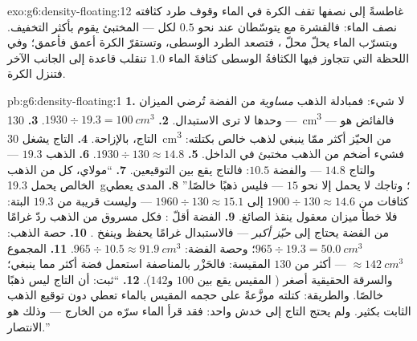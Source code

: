 \begin{solution}{exo:g6:density-floating:12}
غاطسةً إلى نصفها تقف الكرة في الماء وقوف طرد كثافته نصف 
الماء: فالقشرة مع  يتوسّطان عند نحو $0.5$  لكل
 ---  المختبئ يقوم بأكثر التخفيف. وبتسرّب
الماء يحلّ محلّ ، فتصعد  الطرد الوسطى، وتستقرّ
الكرة أعمق فأعمق؛ وفي اللحظة التي تتجاوز فيها الكثافةُ الوسطى
كثافةَ الماء $1.0$ تنقلب قاعدة  إلى الجانب الآخر فتنزل
الكرة.
\end{solution}

\begin{solution}{pb:g6:density-floating:1}
\textbf{1.} لا شيء: فمبادلة الذهب  \emph{مساوية} من الفضة
تُرضي الميزان ---  وحدها لا ترى الاستبدال.
\textbf{2.} $1930 \div 19.3 = \qty{100}{cm^3}$.
\textbf{3.} \qty{130}{cm^3} --- فالفائض هو  التاج،
بالإزاحة.
\textbf{4.} التاج يشغل \qty{30}{cm^3} من الحيّز أكثر ممّا
ينبغي لذهب خالص بكتلته: فشيء أضخم من الذهب مختبئ في الداخل.
\textbf{5.} $1930 \div 130 \approx 14.8$.
\textbf{6.} الذهب $19.3$ --- والتاج $14.8$ --- والفضة $10.5$:
فالتاج يقع بين التوقيعين.
\textbf{7.} ``مولاي، كل  من الذهب الخالص يحمل
\qty{19.3}{g}؛ وتاجك لا يحمل إلا نحو $15$ --- فليس ذهبًا
خالصًا.''
\textbf{8.} المدى يعطي كثافات من $1900 \div 130 \approx
14.6$ إلى $1960 \div 130 \approx 15.1$ --- وليست قريبة من
$19.3$ البتة: فلا خطأ ميزان معقول ينقذ الصائغ.
\textbf{9.} الفضة أقلّ : فكل  مسروق من الذهب ردّ
غرامًا من الفضة يحتاج إلى \emph{حيّز أكبر} --- فالاستبدال
غرامًا  يحفظ  وينفخ .
\textbf{10.} حصة الذهب: $965 \div 19.3 = \qty{50.0}{cm^3}$؛
وحصة الفضة: $965 \div 10.5 \approx \qty{91.9}{cm^3}$.
\textbf{11.} المجموع $\approx \qty{142}{cm^3}$ --- أكثر من
$130$ المقيسة: فالحَزْر بالمناصفة استعمل فضة أكثر مما ينبغي؛
والسرقة الحقيقية أصغر ( المقيس يقع بين $100$ و$142$).
\textbf{12.} ``ثبت: أن التاج ليس ذهبًا خالصًا. والطريقة: كتلته
موزَّعةً على حجمه المقيس بالماء تعطي  دون توقيع الذهب
الثابت بكثير. ولم يحتج التاج إلى خدش واحد: فقد قرأ الماء سرّه
من الخارج --- وذلك هو الانتصار.''
\end{solution}

